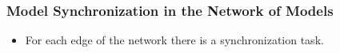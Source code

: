 \documentclass{beamer}
\begin{document}
\begin{frame}[t]
	\frametitle{Model Synchronization in the Network of Models}
	\nocite{diskin2011model}
	\begin{itemize}
		\item For each edge of the network there is a synchronization task.
	\end{itemize}
\end{frame}
\end{document}
